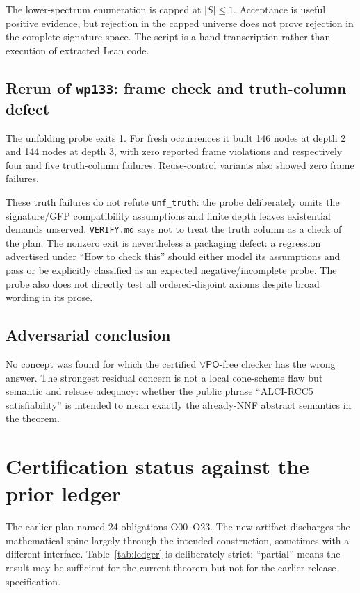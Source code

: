 \documentclass[11pt]{article}
\newcommand{\PO}{\mathsf{PO}}
\newcommand{\code}[1]{\texttt{#1}}
\begin{document}
The lower-spectrum enumeration is capped at $|S|\leq 1$. Acceptance is useful positive
evidence, but rejection in the capped universe does not prove rejection in the complete
signature space. The script is a hand transcription rather than execution of extracted
Lean code.

\subsection{Rerun of \code{wp133}: frame check and truth-column defect}

The unfolding probe exits 1. For fresh occurrences it built 146 nodes at depth 2 and
144 nodes at depth 3, with zero reported frame violations and respectively four and
five truth-column failures. Reuse-control variants also showed zero frame failures.

These truth failures do not refute \code{unf\_truth}: the probe deliberately omits the
signature/GFP compatibility assumptions and finite depth leaves existential demands
unserved. \code{VERIFY.md} says not to treat the truth column as a check of the plan.
The nonzero exit is nevertheless a packaging defect: a regression advertised under
``How to check this'' should either model its assumptions and pass or be explicitly
classified as an expected negative/incomplete probe. The probe also does not directly
test all ordered-disjoint axioms despite broad wording in its prose.

\subsection{Adversarial conclusion}

No concept was found for which the certified $\forall\PO$-free checker has the wrong
answer. The strongest residual concern is not a local cone-scheme flaw but semantic and
release adequacy: whether the public phrase ``ALCI-RCC5 satisfiability'' is intended to
mean exactly the already-NNF abstract semantics in the theorem.

\section{Certification status against the prior ledger}

The earlier plan named 24 obligations O00--O23. The new artifact discharges the
mathematical spine largely through the intended construction, sometimes with a
different interface. Table~\ref{tab:ledger} is deliberately strict: ``partial'' means
the result may be sufficient for the current theorem but not for the earlier release
specification.
\end{document}
